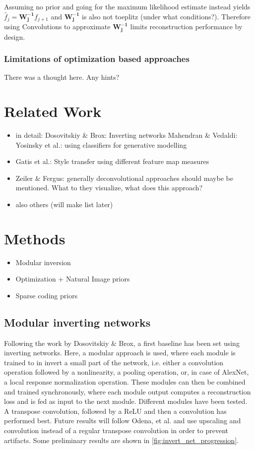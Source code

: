 \documentclass{article}
\begin{document}
Assuming no prior and going for the maximum likelihood estimate instead yields $\hat{f}_j = \bm{W_j^{-1}} f_{j+1}$ and $\bm{W_j^{-1}}$ is also not toeplitz (under what conditions?). Therefore using Convolutions to approximate $\bm{W_j^{-1}}$ limits reconstruction performance by design.


\subsubsection{Limitations of optimization based approaches}

There was a thought here. Any hints?

\section{Related Work}

\begin{itemize}
	\item in detail:
		\subitem Dosovitskiy \& Brox: Inverting networks
		\subitem Mahendran \& Vedaldi: 
		\subitem Yosinsky et al.: using classifiers for generative modelling
	\item Gatis et al.: Style transfer using different feature map measures
	\item Zeiler \& Fergus: generally deconvolutional approaches should maybe be mentioned. What to they visualize, what does this approach?
	\item also others (will make list later)
\end{itemize}


\section{Methods}

\begin{itemize}
	\item Modular inversion
	\item Optimization + Natural Image priors
	\item Sparse coding priors
\end{itemize}

\subsection{Modular inverting networks}

Following the work by Dosovitskiy \& Brox, a first baseline has been set using inverting networks. Here, a modular approach is used, where each module is trained to in invert a small part of the network, i.e. either a convolution operation followed by a nonlinearity, a pooling operation, or, in case of AlexNet, a local response normalization operation. These modules can then be combined and trained synchronously, where each module output computes a reconstruction loss and is fed as input to the next module. Different modules have been tested. A transpose convolution, followed by a ReLU and then a convolution has performed best. Future results will follow Odena, et al. and use upscaling and convolution instead of a regular transpose convolution in order to prevent artifacts. Some preliminary results are shown in \ref{fig:invert_net_progression}.
\end{document}
